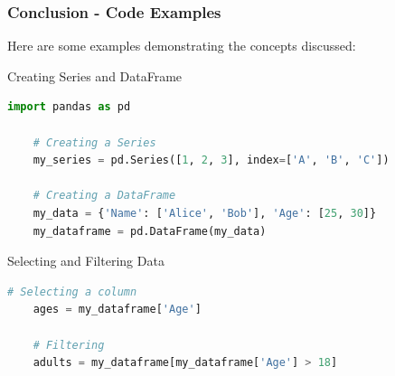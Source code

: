 \documentclass{beamer}
\begin{document}
\begin{frame}[fragile]
    \frametitle{Conclusion - Code Examples}
    Here are some examples demonstrating the concepts discussed:
    
    \begin{block}{Creating Series and DataFrame}
    \begin{lstlisting}[language=Python]
    import pandas as pd
    
    # Creating a Series
    my_series = pd.Series([1, 2, 3], index=['A', 'B', 'C'])

    # Creating a DataFrame
    my_data = {'Name': ['Alice', 'Bob'], 'Age': [25, 30]}
    my_dataframe = pd.DataFrame(my_data)
    \end{lstlisting}
    \end{block}
    
    \begin{block}{Selecting and Filtering Data}
    \begin{lstlisting}[language=Python]
    # Selecting a column
    ages = my_dataframe['Age']

    # Filtering
    adults = my_dataframe[my_dataframe['Age'] > 18]
    \end{lstlisting}
    \end{block}
\end{frame}
\end{document}
